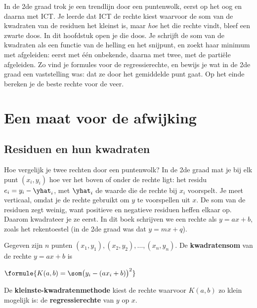In de 2de graad trok je een trendlijn door een puntenwolk, eerst op het oog en daarna met ICT. Je leerde dat ICT de rechte kiest waarvoor de som van de kwadraten van de residuen het kleinst is, maar \textit{hoe} het die rechte vindt, bleef een zwarte doos. In dit hoofdstuk open je die doos. Je schrijft de som van de kwadraten als een functie van de helling en het snijpunt, en zoekt haar minimum met afgeleiden: eerst met één onbekende, daarna met twee, met de partiële afgeleiden. Zo vind je formules voor de regressierechte, en bewijs je wat in de 2de graad een vaststelling was: dat ze door het gemiddelde punt gaat. Op het einde bereken je de beste rechte voor de veer.

\begin{oefeningen}[Start]

\end{oefeningen}


\section{Een maat voor de afwijking}

\subsection{Residuen en hun kwadraten}

Hoe vergelijk je twee rechten door een puntenwolk? In de 2de graad mat je bij elk punt $(x_i, y_i)$ hoe ver het boven of onder de rechte ligt: het residu $e_i = y_i - \yhat_i$, met $\yhat_i$ de waarde die de rechte bij $x_i$ voorspelt. Je meet verticaal, omdat je de rechte gebruikt om $y$ te voorspellen uit $x$. De som van de residuen zegt weinig, want positieve en negatieve residuen heffen elkaar op. Daarom kwadrateer je ze eerst. In dit boek schrijven we een rechte als $y = ax + b$, zoals het rekentoestel (in de 2de graad was dat $y = mx + q$).

\begin{theorie}
Gegeven zijn $n$ punten $(x_1, y_1), (x_2, y_2), \ldots, (x_n, y_n)$. De \textbf{\textcolor{accent}{kwadratensom}} van de rechte $y = ax + b$ is

\vspace{1mm}
\qquad $\formule{K(a, b) = \som \bigl(y_i - (a x_i + b)\bigr)^2}$

\vspace{1mm}
De \textbf{\textcolor{accent}{kleinste-kwadratenmethode}} kiest de rechte waarvoor $K(a, b)$ zo klein mogelijk is: de \textbf{\textcolor{accent}{regressierechte}} van $y$ op $x$.
\end{theorie}

